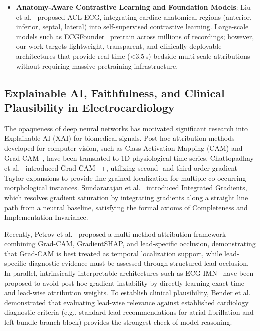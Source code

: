 \documentclass[5p,twocolumn,10pt]{elsarticle}
\begin{document}
\begin{itemize}
    \item \textbf{Anatomy-Aware Contrastive Learning and Foundation Models}: Liu et al.~\cite{liu2026acl} proposed ACL-ECG, integrating cardiac anatomical regions (anterior, inferior, septal, lateral) into self-supervised contrastive learning. Large-scale models such as ECGFounder~\cite{li2025ecgfounder} pretrain across millions of recordings; however, our work targets lightweight, transparent, and clinically deployable architectures that provide real-time (<3.5\,s) bedside multi-scale attributions without requiring massive pretraining infrastructure.
\end{itemize}

\subsection{Explainable AI, Faithfulness, and Clinical Plausibility in Electrocardiology}
The opaqueness of deep neural networks has motivated significant research into Explainable AI (XAI) for biomedical signals. Post-hoc attribution methods developed for computer vision, such as Class Activation Mapping (CAM) and Grad-CAM~\cite{selvaraju2017grad}, have been translated to 1D physiological time-series. Chattopadhay et al.~\cite{chattopadhay2018grad} introduced Grad-CAM++, utilizing second- and third-order gradient Taylor expansions to provide fine-grained localization for multiple co-occurring morphological instances. Sundararajan et al.~\cite{sundararajan2017axiomatic} introduced Integrated Gradients, which resolves gradient saturation by integrating gradients along a straight line path from a neutral baseline, satisfying the formal axioms of Completeness and Implementation Invariance. 

Recently, Petrov et al.~\cite{stacked_xai2025} proposed a multi-method attribution framework combining Grad-CAM, GradientSHAP, and lead-specific occlusion, demonstrating that Grad-CAM is best treated as temporal localization support, while lead-specific diagnostic evidence must be assessed through structured lead occlusion. In parallel, intrinsically interpretable architectures such as ECG-IMN~\cite{ecg_imn2026} have been proposed to avoid post-hoc gradient instability by directly learning exact time- and lead-wise attribution weights. To establish clinical plausibility, Bender et al.~\cite{bender2022relevance} demonstrated that evaluating lead-wise relevance against established cardiology diagnostic criteria (e.g., standard lead recommendations for atrial fibrillation and left bundle branch block) provides the strongest check of model reasoning. 
\end{document}
